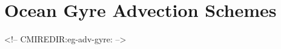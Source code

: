


\section[Gyre Advection Example]{Ocean Gyre Advection Schemes}
\label{sect:eg-adv-gyre}
\label{www:tutorials}
\begin{rawhtml}
<!-- CMIREDIR:eg-adv-gyre: -->
\end{rawhtml}



